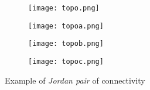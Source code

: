 \begin{figure}

	\begin{subfigure}[b]{0.3\textwidth}
	 	\texttt{[image: topo.png]} \caption{}\label{fig:topo} \end{subfigure}
	\begin{subfigure}[b]{0.3\textwidth}
		\texttt{[image: topoa.png]} \caption{}\label{fig:topoa} \end{subfigure}	
\centering		
		
	\begin{subfigure}[b]{0.3\textwidth}
		\texttt{[image: topob.png]} \caption{}\label{fig:topob} \end{subfigure}
	\begin{subfigure}[b]{0.3\textwidth}
		\texttt{[image: topoc.png]} \caption{}\label{fig:topoc} \end{subfigure}
	\centering
	\caption[Example of \textit{Jordan pair} of connectivity] {Example of \textit{Jordan pair} of connectivity}
	\label{fig:Jordanpair}
\end{figure}


